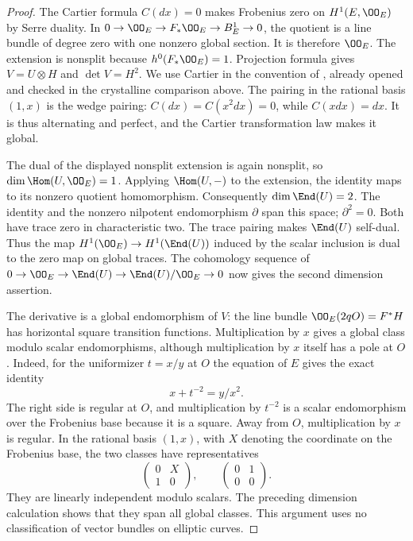 \begin{proof}
The Cartier formula $C(dx)=0$ makes Frobenius zero on $H^1(E,\OO_E)$
by Serre duality.  In
$0\to\OO_E\to F_*\OO_E\to B^1_E\to0$, the quotient is a line
bundle of degree zero with one nonzero global section.  It is therefore
$\OO_E$.  The extension is nonsplit because $h^0(F_*\OO_E)=1$.
Projection formula gives $V=U\otimes H$ and $\det V=H^2$.
We use Cartier in the convention of
\cite[0, Theorem~2.1.9, p.~515]{Illusie1979DRW}, already opened and
checked in the crystalline comparison above.
The pairing in the rational basis $(1,x)$ is the wedge pairing:
$C(dx)=C(x^2dx)=0$, while $C(xdx)=dx$.  It is thus alternating and
perfect, and the Cartier transformation law makes it global.

The dual of the displayed nonsplit extension is again nonsplit, so
$\dim\Hom(U,\OO_E)=1$.  Applying $\Hom(U,-)$ to the extension,
the identity maps to its nonzero quotient homomorphism.  Consequently
$\dim\End(U)=2$.  The identity and the nonzero nilpotent endomorphism
$\partial$ span this space; $\partial^2=0$.  Both have trace zero
in characteristic two.  The trace pairing makes $\End(U)$ self-dual.
Thus the map $H^1(\OO_E)\to H^1(\End(U))$ induced by the scalar
inclusion is dual to the zero map on global traces.  The cohomology
sequence of $0\to\OO_E\to\End(U)\to\End(U)/\OO_E\to0$ now gives
the second dimension assertion.

The derivative is a global endomorphism of $V$: the line bundle
$\OO_E(2qO)=F^*H$ has horizontal square transition functions.
Multiplication by $x$ gives a global class modulo scalar endomorphisms,
although multiplication by $x$ itself has a pole at $O$.  Indeed, for
the uniformizer $t=x/y$ at $O$ the equation of $E$ gives the exact identity
\[
                    x+t^{-2}=y/x^2.
\]
The right side is regular at $O$, and multiplication by $t^{-2}$ is a
scalar endomorphism over the Frobenius base because it is a square.
Away from $O$, multiplication by $x$ is regular.  In the rational basis
$(1,x)$, with $X$ denoting the coordinate on the Frobenius base, the two
classes have representatives
\[
 \begin{pmatrix}0&X\\1&0\end{pmatrix},\qquad
 \begin{pmatrix}0&1\\0&0\end{pmatrix}.
\]
They are linearly independent modulo scalars.  The preceding dimension
calculation shows that they span all global classes.  This argument
uses no classification of vector bundles on elliptic curves.
\end{proof}

